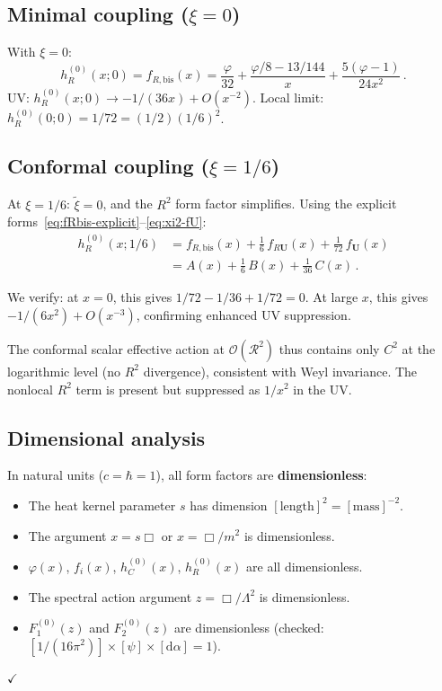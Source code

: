 \documentclass[11pt,a4paper]{article}
\newcommand{\dd}{\mathrm{d}}
\newcommand{\xitilde}{\tilde{\xi}}
\theoremstyle{definition}
\theoremstyle{remark}
\begin{document}
\subsection{Minimal coupling ($\xi = 0$)}

With $\xi = 0$:
\begin{equation}
  h_R^{(0)}(x;0) = f_{R,\text{bis}}(x)
  = \frac{\varphi}{32}
  + \frac{\varphi/8 - 13/144}{x}
  + \frac{5(\varphi-1)}{24x^2}\,.
  \label{eq:hR-minimal}
\end{equation}
UV: $h_R^{(0)}(x;0) \to -1/(36x) + O(x^{-2})$.
Local limit: $h_R^{(0)}(0;0) = 1/72 = (1/2)(1/6)^2$.

\subsection{Conformal coupling ($\xi = 1/6$)}

At $\xi = 1/6$: $\xitilde = 0$, and the $R^2$ form factor
simplifies.  Using the explicit
forms~\eqref{eq:fRbis-explicit}--\eqref{eq:xi2-fU}:
\begin{align}
  h_R^{(0)}(x;1/6) &= f_{R,\text{bis}}(x)
  + \frac{1}{6}\,f_{R\mathbf{U}}(x)
  + \frac{1}{72}\,f_{\mathbf{U}}(x)
  \nonumber\\
  &= A(x) + \frac{1}{6}\,B(x) + \frac{1}{36}\,C(x)\,.
  \label{eq:hR-conformal}
\end{align}

We verify: at $x = 0$, this gives $1/72 - 1/36 + 1/72 = 0$.
At large $x$, this gives $-1/(6x^2) + O(x^{-3})$, confirming
enhanced UV suppression.

The conformal scalar effective action at $\mathcal{O}(\mathcal{R}^2)$
thus contains only $C^2$ at the logarithmic level (no $R^2$ divergence),
consistent with Weyl invariance.  The nonlocal $R^2$ term is
present but suppressed as $1/x^2$ in the UV.


\subsection{Dimensional analysis}

In natural units ($c = \hbar = 1$), all form factors are
\textbf{dimensionless}:
\begin{itemize}[nosep]
\item The heat kernel parameter $s$ has dimension
  $[\text{length}]^2 = [\text{mass}]^{-2}$.
\item The argument $x = s\Box$ or $x = \Box/m^2$ is dimensionless.
\item $\varphi(x)$, $f_i(x)$, $h_C^{(0)}(x)$, $h_R^{(0)}(x)$
  are all dimensionless.
\item The spectral action argument $z = \Box/\Lambda^2$
  is dimensionless.
\item $F_1^{(0)}(z)$ and $F_2^{(0)}(z)$ are dimensionless
  (checked: $[1/(16\pi^2)] \times [\psi] \times [\dd\alpha] = 1$).
\end{itemize}
\quad$\checkmark$
\end{document}

